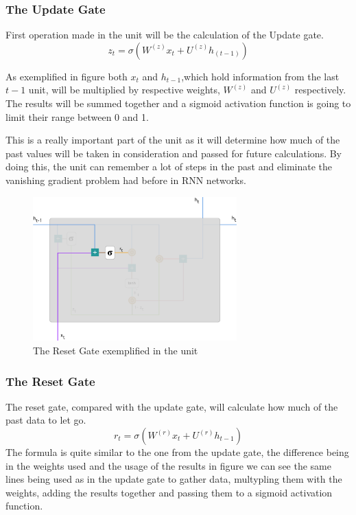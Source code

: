 \subsubsection{The Update Gate}

First operation made in the unit will be the calculation of the Update gate.
\begin{equation}
  z_t =\sigma(W^{(z)}x_t + U^{(z)}h_{(t-1)})
\end{equation}

As exemplified in figure  both $x_t$ and $h_{t-1}$,which hold information from the last $t-1$ unit, will be multiplied by respective weights, $W^{(z)}$ and $U^{(z)}$ respectively. The results will be summed together and a sigmoid activation function is going to limit their range between 0 and 1.

This is a really important part of the unit as it will determine how much of the past values will be taken in consideration and passed for future calculations. By doing this, the unit can remember a lot of steps in the past and eliminate the vanishing gradient problem had before in RNN networks.

\begin{figure}[htp]
	\centering
	\includegraphics[width=0.7\textwidth]{Illustrations/GRUresetgate.png}
	\caption{The Reset Gate exemplified in the unit}
	\label{fig:GRUresetgate}
\end{figure}

\subsubsection{The Reset Gate}
The reset gate, compared with the update gate, will calculate how much of the past data to let go.
\begin{equation}
r_t=\sigma(W^{(r)}x_t+U^{(r)}h_{t-1})
\end{equation}
The formula is quite similar to the one from the update gate, the difference being in the weights used and the usage of the results in figure we can see the same lines being used as in the update gate to gather data, multypling them with the weights, adding the results together and passing them to a sigmoid activation function.

